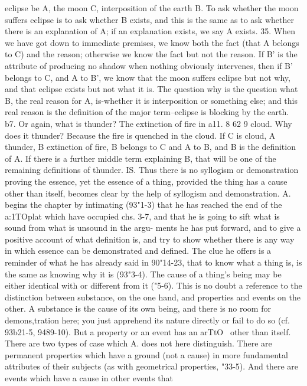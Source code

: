 {{{{{{{{{{{{{{{{{{{{{{{{{{{{{{{eclipse be A, the moon C, interposition of the earth B. To ask
whether the moon suffers eclipse is to ask whether B exists, and
this is the same as to ask whether there is an explanation of A;
if an explanation exists, we say A exists.
35. When we have got down to immediate premises, we know
both the fact (that A belongs to C) and the reason; otherwise
we know the fact but not the reason. If B' is the attribute of
producing no shadow when nothing obviously intervenes, then
if B' belongs to C, and A to B', we know that the moon suffers
eclipse but not why, and that eclipse exists but not what it is.
The question why is the question what B, the real reason for
A, is-whether it is interposition or something else; and this
real reason is the definition of the major term--eclipse is blocking
by the earth.
b7. Or again, what is thunder? The extinction of fire in a11. 8
62 9
cloud. Why does it thunder? Because the fire is quenched in
the cloud. If C is cloud, A thunder, B extinction of fire, B belongs
to C and A to B, and B is the definition of A. If there is a further
middle term explaining B, that will be one of the remaining
definitions of thunder.
IS. Thus there is no syllogism or demonstration proving the
essence, yet the essence of a thing, provided the thing has a cause
other than itself, becomes clear by the help of syllogism and
demonstration.
A. begins the chapter by intimating (93"1-3) that he has reached
the end of the a:1TOplat which have occupied chs. 3-7, and that he
is going to sift what is sound from what is unsound in the argu-
ments he has put forward, and to give a positive account of what
definition is, and try to show whether there is any way in which
essence can be demonstrated and defined. The clue he offers is
a reminder of what he has already said in 90"14-23, that to know
what a thing is, is the same as knowing why it is (93"3-4). The
cause of a thing's being may be either identical with or different
from it ("5-6). This is no doubt a reference to the distinction
between substance, on the one hand, and properties and events
on the other. A substance is the cause of its own being, and there
is no room for demons,tration here; you just apprehend its nature
directly or fail to do so (cf. 93b21-5, 9489-10). But a property or
an event has an arTtO~ other than itself. There are two types of
case which A. does not here distinguish. There are permanent
properties which have a ground (not a cause) in more fundamental
attributes of their subjects (as with geometrical properties, "33-5).
And there are events which have a cause in other events that
}}}}}}}}}}}}}}}}}}}}}}}}}}}}}}}
